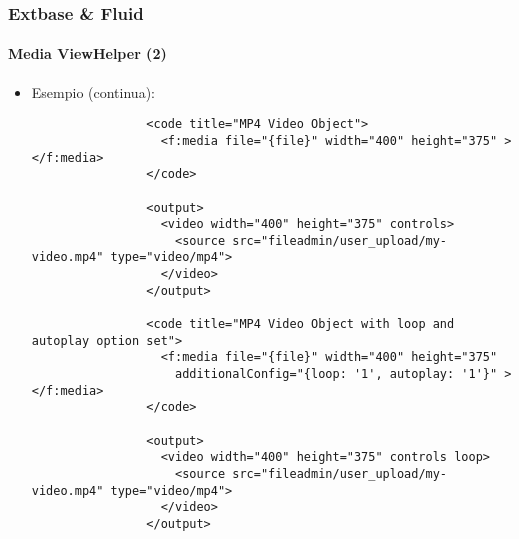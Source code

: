 
\begin{frame}[fragile]
	\frametitle{Extbase \& Fluid}
	\framesubtitle{Media ViewHelper (2)}

	\lstset{basicstyle=\tiny\ttfamily}

	\begin{itemize}

		\item Esempio (continua):

			\begin{lstlisting}
				<code title="MP4 Video Object">
				  <f:media file="{file}" width="400" height="375" ></f:media>
				</code>

				<output>
				  <video width="400" height="375" controls>
				    <source src="fileadmin/user_upload/my-video.mp4" type="video/mp4">
				  </video>
				</output>

				<code title="MP4 Video Object with loop and autoplay option set">
				  <f:media file="{file}" width="400" height="375"
				    additionalConfig="{loop: '1', autoplay: '1'}" ></f:media>
				</code>

				<output>
				  <video width="400" height="375" controls loop>
				    <source src="fileadmin/user_upload/my-video.mp4" type="video/mp4">
				  </video>
				</output>
			\end{lstlisting}

	\end{itemize}

\end{frame}


